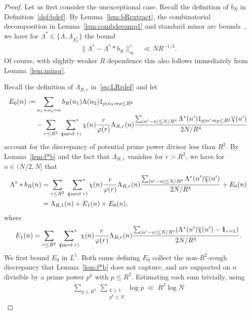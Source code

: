 \documentclass[12pt]{amsart}
\theoremstyle{definition}
\theoremstyle{remark}
\numberwithin{equation}{section}
\newcommand{\asum}{\sideset{}{^{\ast}}\sum}
\newcommand{\1}{\mathbf{1}}
\let\oldpmod\pmod
\renewcommand{\pmod}[1]{\hspace{-0.12cm}\oldpmod {#1}}
\begin{document}
\begin{proof}

Let us first consider the unexceptional case. Recall the definition of $b_R$ in Definition~\ref{def:bdef}. 
    By Lemma~\ref{lem:bRextract}, the combinatorial decomposition in Lemma~\ref{lem:combdecomp1} and standard minor arc bounds~\cite[Lemma 13.7, 13.8]{iw-kow}, we have for $\Lambda^*\in \{\Lambda, \Lambda_{E_3^*}\} $ the bound
    \begin{align}\label{eq:roughappr2}
        \|\Lambda^*- \Lambda^* * b_{R}\|^{\wedge}_\infty &\ll N R^{-1/3}.
    \end{align}
    Of course, with slightly weaker $R$ dependence this also follows immediately from Lemma~\ref{lem:minor}.

Recall the definition of $\Lambda_{R,r}$ in~\eqref{eq:LRrdef} and let
\begin{align*}
    E_0(n):=&\sum_{n_1+n_2=n} b_R(n_1) \Lambda(n_2) 1_{p|n_2 \Rightarrow p\leq R^2}\\
    &-\sum_{r\leq R^2}\,\,\,\asum_{\chi\pmod r} \chi(n)\frac{r}{\varphi(r)} \Lambda_{R,r}(n) \frac{\sum_{|n'-n|\leq N/R^4}  \Lambda^*(n')1_{p|n' \Rightarrow p\leq R^2}\overline{\chi}(n')}{2N/R^4}
\end{align*}
 account for the discrepancy of potential prime power divisor less than $R^2$.  By Lemma~\ref{lem:f*b} and the fact that $\Lambda_{R,r}$ vanishes for $r>R^2$, we have for $n\in (N/2,N]$ that
    \begin{align*}
        \Lambda^* *b_{R}(n)&=\sum_{r\leq R^2}\,\,\,\asum_{\chi\pmod r} \chi(n)\frac{r}{\varphi(r)} \Lambda_{R,r}(n) \frac{\sum_{|n'-n|\leq N/R^4}  \Lambda^*(n')\overline{\chi}(n')}{2N/R^4}+E_0(n)\\
        &=\Lambda_{R,1}(n) + E_1(n)+E_0(n),
    \end{align*}
    where
    \begin{align*}
         E_1(n)=\sum_{r\leq R^2}\,\,\,\asum_{\chi\pmod r} \chi(n)\frac{r}{\varphi(r)} \Lambda_{R,r}(n)  \frac{\sum_{|n'-n|\leq N/R^4} (\Lambda^*(n')\overline{\chi}(n')-\1_{r=1})}{2N/R^4}.
    \end{align*}    
  We first bound $E_0$ in $L^1$. Both sums defining $E_0$ collect the non-$R^2$-rough discrepancy that Lemma~\ref{lem:f*b} does not capture, and are supported on $n$ divisible by a prime power $p^k$ with $p\le R^2$. Estimating each sum trivially, using
        \begin{align*}
          \sum_{p\le R^2}\ \sum_{\substack{k\ge1\\ p^k\le N}}\log p\ \ll\ R^2\log N

\end{align*}
\end{proof}
\end{document}
